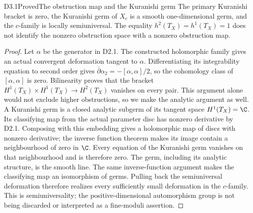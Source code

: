 \begin{claim}{D3.1}{Proved}{The obstruction map and the Kuranishi germ}
The primary Kuranishi bracket is zero, the Kuranishi germ of $X_c$ is
a smooth one-dimensional germ, and the $c$-family is locally
semiuniversal. The equality $h^2(T_X)=h^1(T_X)=1$ does not identify the
nonzero obstruction space with a nonzero obstruction map.
\end{claim}
\begin{proof}
Let $\alpha$ be the generator in D2.1. The constructed holomorphic
family gives an actual convergent deformation tangent to $\alpha$.
Differentiating its integrability equation to second order gives
$\bar\partial\alpha_2=-[\alpha,\alpha]/2$, so the cohomology class
of $[\alpha,\alpha]$ is zero. Bilinearity proves that the bracket
$H^1(T_X)\times H^1(T_X)\to H^2(T_X)$ vanishes on every pair.
This argument alone would not exclude higher obstructions, so we
make the analytic argument as well. A Kuranishi germ is a closed
analytic subgerm of its tangent space $H^1(T_X)=\C$. Its classifying
map from the actual parameter disc has nonzero derivative by D2.1.
Composing with this embedding gives a holomorphic map of discs with
nonzero derivative; the inverse function theorem makes its image
contain a neighbourhood of zero in $\C$. Every equation of the
Kuranishi germ vanishes on that neighbourhood and is therefore zero.
The germ, including its analytic structure, is the smooth line.
The same inverse-function argument makes the classifying map an
isomorphism of germs. Pulling back the semiuniversal deformation
therefore realizes every sufficiently small deformation in the
$c$-family. This is semiuniversality; the positive-dimensional
automorphism group is not being discarded or interpreted as a
fine-moduli assertion.
\end{proof}
